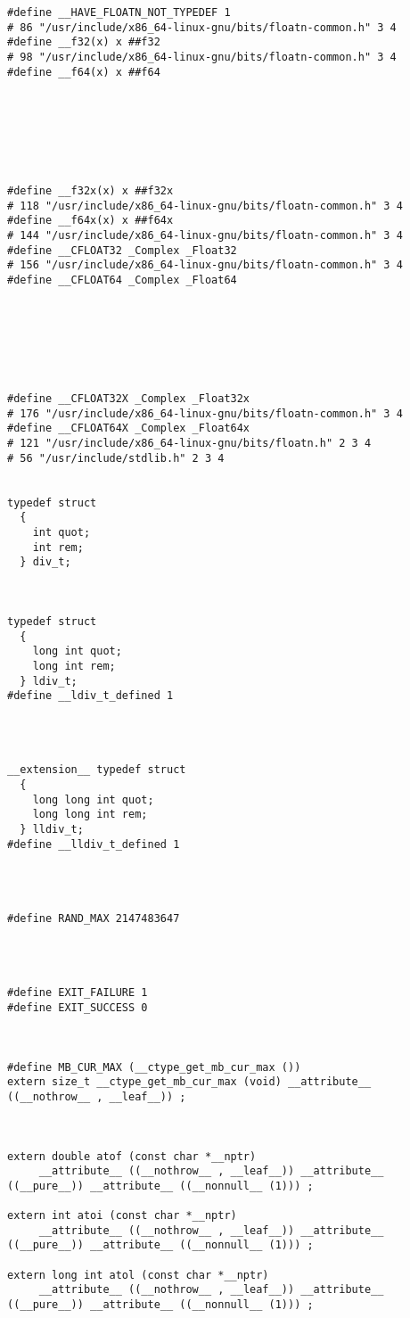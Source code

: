 \documentclass[11pt]{article}
\begin{document}
\begin{enumerate}
\begin{verbatim}
#define __HAVE_FLOATN_NOT_TYPEDEF 1
# 86 "/usr/include/x86_64-linux-gnu/bits/floatn-common.h" 3 4
#define __f32(x) x ##f32
# 98 "/usr/include/x86_64-linux-gnu/bits/floatn-common.h" 3 4
#define __f64(x) x ##f64







#define __f32x(x) x ##f32x
# 118 "/usr/include/x86_64-linux-gnu/bits/floatn-common.h" 3 4
#define __f64x(x) x ##f64x
# 144 "/usr/include/x86_64-linux-gnu/bits/floatn-common.h" 3 4
#define __CFLOAT32 _Complex _Float32
# 156 "/usr/include/x86_64-linux-gnu/bits/floatn-common.h" 3 4
#define __CFLOAT64 _Complex _Float64







#define __CFLOAT32X _Complex _Float32x
# 176 "/usr/include/x86_64-linux-gnu/bits/floatn-common.h" 3 4
#define __CFLOAT64X _Complex _Float64x
# 121 "/usr/include/x86_64-linux-gnu/bits/floatn.h" 2 3 4
# 56 "/usr/include/stdlib.h" 2 3 4


typedef struct
  {
    int quot;
    int rem;
  } div_t;



typedef struct
  {
    long int quot;
    long int rem;
  } ldiv_t;
#define __ldiv_t_defined 1




__extension__ typedef struct
  {
    long long int quot;
    long long int rem;
  } lldiv_t;
#define __lldiv_t_defined 1




#define RAND_MAX 2147483647




#define EXIT_FAILURE 1
#define EXIT_SUCCESS 0



#define MB_CUR_MAX (__ctype_get_mb_cur_max ())
extern size_t __ctype_get_mb_cur_max (void) __attribute__ ((__nothrow__ , __leaf__)) ;



extern double atof (const char *__nptr)
     __attribute__ ((__nothrow__ , __leaf__)) __attribute__ ((__pure__)) __attribute__ ((__nonnull__ (1))) ;

extern int atoi (const char *__nptr)
     __attribute__ ((__nothrow__ , __leaf__)) __attribute__ ((__pure__)) __attribute__ ((__nonnull__ (1))) ;

extern long int atol (const char *__nptr)
     __attribute__ ((__nothrow__ , __leaf__)) __attribute__ ((__pure__)) __attribute__ ((__nonnull__ (1))) ;




\end{verbatim}
\end{enumerate}
\end{document}
